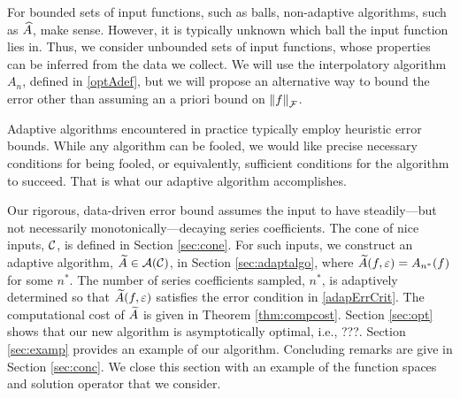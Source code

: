 \documentclass[final]{elsarticle}
\theoremstyle{definition}
\theoremstyle{remark}
\newcommand{\optAn}{A_n}
\begin{document}
For bounded sets of input functions, such as balls, non-adaptive algorithms, such as $\hA$, make sense.  However, it is typically unknown which ball the input function lies in.  Thus, we consider unbounded sets of input functions, whose properties can be inferred from the data we collect.  We will use the interpolatory algorithm $\optAn$, defined in \eqref{optAdef}, but we will propose an alternative way to bound the error other than assuming an a priori bound on $\norm[\cf]{f}$.

Adaptive algorithms encountered in practice typically employ heuristic error bounds.  While any algorithm can be fooled, we would like precise necessary conditions for being fooled, or equivalently, sufficient conditions for the algorithm to succeed.  That is what our adaptive algorithm accomplishes.

Our rigorous, data-driven error bound assumes the input to have steadily---but not necessarily monotonically---decaying series coefficients.  The cone of nice inputs, $\cc$, is defined in Section \ref{sec:cone}.  For such inputs, we construct an adaptive algorithm, $\tA \in \ca(\cc)$, in Section \ref{sec:adaptalgo},  where $\tA(f,\varepsilon) = A_{n^*}(f)$ for some $n^*$.  The number of series coefficients sampled, $n^*$, is adaptively determined so that $\tA(f,\varepsilon)$ satisfies the error condition in \eqref{adapErrCrit}.  The computational cost of $\tA$ is given in  Theorem \ref{thm:compcost}.  Section \ref{sec:opt} shows that our new algorithm is asymptotically optimal, i.e., ???.  Section \ref{sec:examp} provides an example of our algorithm.  Concluding remarks are give in Section \ref{sec:conc}.  We close this section with an example of the function spaces and solution operator that we consider.
\end{document}
